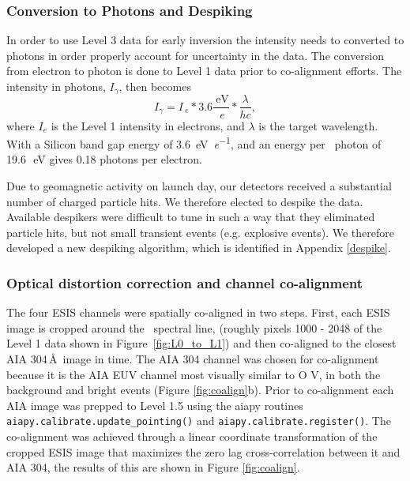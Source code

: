     
\subsubsection{Conversion to Photons and Despiking}
In order to use Level 3 data for early inversion the intensity needs to  converted to photons in order properly account for uncertainty in the data.
The conversion from electron to photon is done to Level 1 data prior to co-alignment efforts.
The intensity in photons, $I_{\gamma}$, then becomes
\begin{equation}
  I_{\gamma} = I_{\SI{}{\elementarycharge}} * 3.6 \frac{\SI{}{\electronvolt}}{\SI{}{\elementarycharge}} * \frac{\lambda}{hc},
\end{equation}
where $I_e$ is the Level 1 intensity in electrons, and $\lambda$ is the target wavelength.
With a Silicon band gap energy of \SI[per-mode=symbol]{3.6}{\electronvolt\per\elementarycharge}, and an energy per \ov \ photon 
of 19.6\,\SI{}{\electronvolt} gives 0.18 photons per electron.


Due to geomagnetic activity on launch day, our detectors received a substantial number of charged particle hits. 
We therefore elected to despike the data.
Available despikers were difficult to tune in such a way that they eliminated particle hits, but not small transient events (e.g. explosive events). We therefore developed a new despiking algorithm, which is identified in Appendix \ref{despike}.






        
\subsubsection{Optical distortion correction and channel co-alignment}
   
  The four ESIS channels were spatially co-aligned in two steps.
First, each ESIS image is cropped around the \ov \ spectral line, (roughly pixels 1000 - 2048 of the Level 1 data shown in Figure~\ref{fig:L0_to_L1}) and then co-aligned to the closest AIA 304\,\AA\ image in time.  
The AIA 304 channel was chosen for co-alignment because it is the AIA EUV channel most visually similar to O V, in both the background and bright events (Figure \ref{fig:coalign}b).
Prior to co-alignment each AIA image was prepped to Level 1.5 using the aiapy routines \texttt{aiapy.calibrate.update\_pointing()} and \texttt{aiapy.calibrate.register()}.
The co-alignment was achieved through a linear coordinate transformation of the cropped ESIS image that maximizes the zero lag cross-correlation between it and AIA 304, the results of this are shown in Figure \ref{fig:coalign}.

